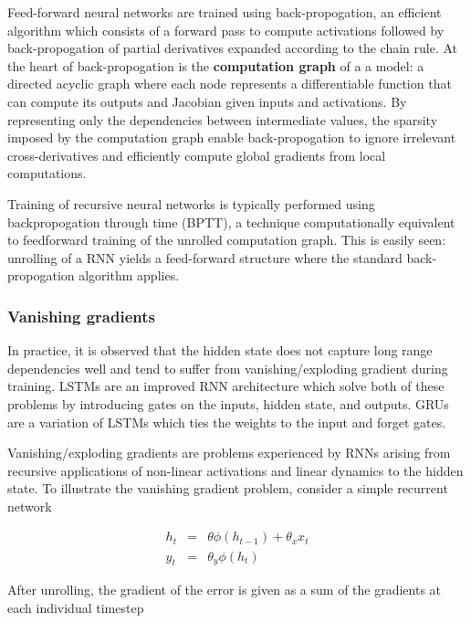 Feed-forward neural networks are trained using back-propogation, an efficient
algorithm which consists of a forward pass to compute activations followed by
back-propogation of partial derivatives expanded according to the chain
rule. At the heart of back-propogation is the
\textbf{computation graph} of a a model: a directed acyclic graph where each
node represents a differentiable function that can compute its outputs and
Jacobian given inputs and activations. By representing only
the dependencies between intermediate values, the sparsity imposed by the
computation graph enable back-propogation to ignore irrelevant
cross-derivatives and efficiently compute global gradients from local
computations.


Training of recursive neural networks is typically performed using
backpropogation through time (BPTT)\cite{at}, a technique computationally
equivalent to feedforward training of the unrolled computation graph. This is
easily seen: unrolling of a RNN yields a feed-forward structure where the
standard back-propogation algorithm applies.




\subsubsection{Vanishing gradients}

In practice, it is observed that the hidden state does not capture long range
dependencies well and tend to suffer from vanishing/exploding gradient during
training. LSTMs are an improved RNN architecture which solve both of these
problems by introducing gates on the inputs, hidden state, and outputs. GRUs are
a variation of LSTMs which ties the weights to the input and forget gates.

Vanishing/exploding gradients \cite{Bengio1994} are problems experienced by
RNNs arising from recursive applications of non-linear activations and linear dynamics
to the hidden state. To illustrate the vanishing gradient problem, consider
a simple recurrent network

\begin{eqnarray}
    h_t &=& \theta \phi(h_{t-1}) + \theta_x x_t \label{eq:ht-from-ht-1}\\
    y_t &=& \theta_y \phi(h_t)
\end{eqnarray}

After unrolling, the gradient of the error is given as a sum of the gradients
at each individual timestep

